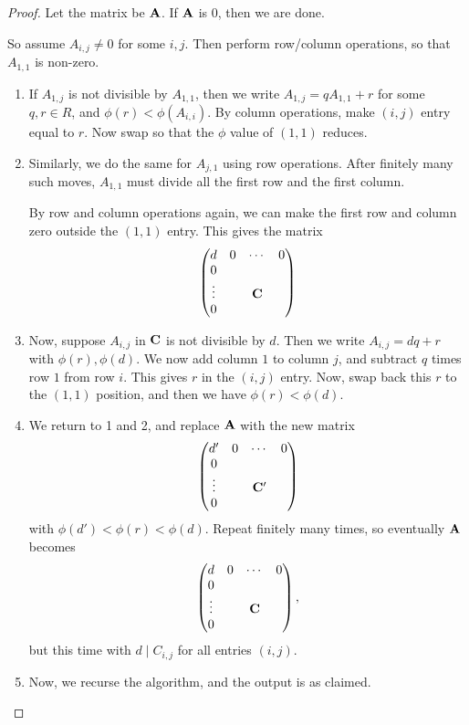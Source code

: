 \documentclass{article}
\theoremstyle{definition}
\theoremstyle{remark}
\newcommand{\pqty}[1]{\left(#1\right)}
\newcommand{\pmqty}[1]{\begin{pmatrix}#1\end{pmatrix}}
\newcommand{\divides}{\mid}
\newcommand{\zeroM}{0}
\begin{document}
\begin{proof}
    Let the matrix be \(\vb{A}\). If \(\vb{A}\) is \(\zeroM\), then we are done.

    So assume \(A_{i, j} \neq 0\) for some \(i, j\). Then perform row/column operations, so that \(A_{1, 1}\) is non-zero.

    \begin{enumerate}
        \item If \(A_{1, j}\) is not divisible by \(A_{1, 1}\), then we write \(A_{1, j} = q A_{1, 1} + r\) for some \(q, r \in R\), and \(\phi\pqty{r} < \phi\pqty{A_{i, i}}\). By column operations, make \(\pqty{i, j}\) entry equal to \(r\). Now swap so that the \(\phi\) value of \(\pqty{1, 1}\) reduces.

        \item Similarly, we do the same for \(A_{j, 1}\) using row operations. After finitely many such moves, \(A_{1, 1}\) must divide all the first row and the first column.

        By row and column operations again, we can make the first row and column zero outside the \(\pqty{1, 1}\) entry. This gives the matrix
        \[
            \pmqty{
                d & 0 & \cdots & 0 \\
                0 & & & \\
                \vdots & & \vb{C} & \\
                0 & & &
            }
        \]

        \item Now, suppose \(A_{i, j}\) in \(\vb{C}\) is not divisible by \(d\). Then we write \(A_{i, j} = dq + r\) with \(\phi\pqty{r}, \phi\pqty{d}\). We now add column \(1\) to column \(j\), and subtract \(q\) times row \(1\) from row \(i\). This gives \(r\) in the \(\pqty{i, j}\) entry. Now, swap back this \(r\) to the \(\pqty{1, 1}\) position, and then we have \(\phi\pqty{r} < \phi\pqty{d}\).

        \item We return to 1 and 2, and replace \(\vb{A}\) with the new matrix
        \[
            \pmqty{
                d' & 0 & \cdots & 0 \\
                0 & & & \\
                \vdots & & \vb{C}' & \\
                0 & & &
            }
        \]
        with \(\phi\pqty{d'} < \phi\pqty{r} < \phi\pqty{d}\). Repeat finitely many times, so eventually \(\vb{A}\) becomes
        \[
            \pmqty{
                d & 0 & \cdots & 0 \\
                0 & & & \\
                \vdots & & \vb{C} & \\
                0 & & &
            },
        \]
        but this time with \(d \divides C_{i, j}\) for all entries \(\pqty{i, j}\).

        \item Now, we recurse the algorithm, and the output is as claimed.
    \end{enumerate}
\end{proof}
\end{document}

